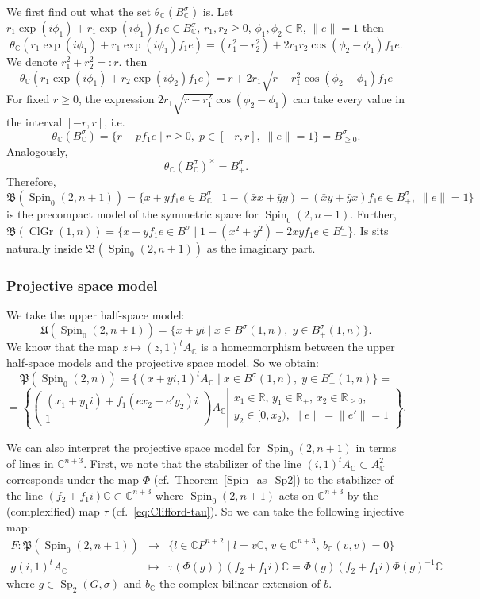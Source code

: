 \documentclass[a4paper,oneside,11pt]{amsart}
\DeclareMathOperator{\Sp}{Sp}
\DeclareMathOperator{\ClGr}{ClGr}
\DeclareMathOperator{\Spin}{Spin}
\newcommand{\R}{\mathbb R}
\newcommand{\CC}{\mathbb C}
\theoremstyle{plain}
\theoremstyle{definition}
\theoremstyle{remark}
\begin{document}
We first find out what the set $\theta_\CC(B^\sigma_\CC)$ is.
Let $r_1\exp(i\phi_1)+r_1\exp(i\phi_1)f_1e\in B^\sigma_\CC$, $r_1,r_2\geq 0$, $\phi_1,\phi_2\in\R$, $\|e\|=1$ then
$$\theta_\CC(r_1\exp(i\phi_1)+r_1\exp(i\phi_1)f_1e)=(r_1^2+r_2^2)+ 2r_1r_2\cos(\phi_2-\phi_1)f_1e.$$
We denote $r_1^2+r_2^2=:r$. then
$$\theta_\CC(r_1\exp(i\phi_1)+r_2\exp(i\phi_2)f_1e)=r+2r_1\sqrt{r-r_1^2}\cos(\phi_2-\phi_1)f_1e$$
For fixed $r\geq 0$, the expression $2r_1\sqrt{r-r_1^2}\cos(\phi_2-\phi_1)$ can take every value in the interval $[-r,r]$, i.e.
$$\theta_\CC(B^\sigma_\CC)=\{r+pf_1e\mid r\geq 0,\;p\in [-r,r],\;\|e\|=1\}=B^{\sigma}_{\geq 0}.$$
Analogously,
$$\theta_\CC(B^\sigma_\CC)^\times=B^{\sigma}_+.$$
Therefore,
$$\mathfrak{B}(\Spin_0(2,n+1))=\{x+yf_1e\in B_\CC^\sigma\mid 1-(\bar xx+\bar yy)-(\bar xy+\bar yx)f_1e\in B^{\sigma}_+,\;\|e\|=1\}$$
is the precompact model of the symmetric space for $\Spin_0(2,n+1)$. Further,  $\mathfrak B (\ClGr(1,n))=\{x+yf_1e\in B^\sigma\mid 1-(x^2+y^2)-2xyf_1e\in B^\sigma_+\}$. Is sits naturally inside $\mathfrak B(\Spin_0(2,n+1))$ as the imaginary part.


\subsubsection{Projective space model}
We take the upper half-space model:
$$\mathfrak U(\Spin_0(2,n+1))=\{x+yi\mid x\in B^{\sigma}(1,n),\;y\in B^{\sigma}_+(1,n)\}.$$
We know that the map $z\mapsto (z,1)^tA_\CC$ is a homeomorphism between the upper half-space models and the projective space model. So we obtain:
$$\mathfrak P(\Spin_0(2,n))=\{(x+yi,1)^tA_\CC\mid x\in B^{\sigma}(1,n),\;y\in B^{\sigma}_+(1,n)\}=$$
$$=\left\{\begin{pmatrix}(x_1+y_1i)+f_1(ex_2+e'y_2)i\\1\end{pmatrix}A_\CC\left|
\begin{array}{l}
x_1\in\R,\,y_1\in\R_+,\,x_2\in\R_{\geq 0},\\
y_2\in[0,x_2),\,\|e\|=\|e'\|=1
\end{array}
\right.\right\}.$$

We can also interpret the projective space model for $\Spin_0(2,n+1)$ in terms of lines in $\CC^{n+3}$. First, we note that the stabilizer of the line $(i,1)^tA_\CC\subset A_\CC^2$ corresponds under the map $\Phi$ (cf.~Theorem~\ref{Spin_as_Sp2}) to the stabilizer of the line $(f_2+f_1i)\CC\subset\CC^{n+3}$ where $\Spin_0(2,n+1)$ acts on $\CC^{n+3}$ by the (complexified) map $\tau$ (cf.~\eqref{eq:Clifford-tau}). So we can take the following injective map:
$$\begin{array}{rcl}
F\colon \mathfrak P(\Spin_0(2,n+1)) & \to & \{l\in\CC P^{n+2}\mid l=v\CC,\,v\in\CC^{n+3},\,b_\CC(v,v)=0\}\\
 g(i,1)^tA_\CC & \mapsto & \tau(\Phi(g))(f_2+f_1i)\CC=\Phi(g)(f_2+f_1i)\Phi(g)^{-1}\CC
\end{array}$$
where $g\in\Sp_2(G,\sigma)$ and $b_\CC$ the complex bilinear extension of $b$.
\end{document}
